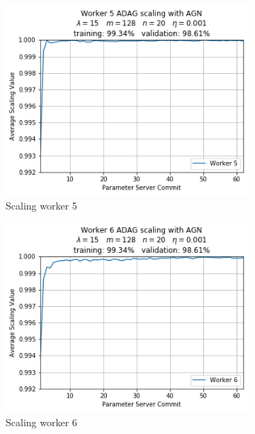 \begin{figure}
\begin{subfigure}{.24\textwidth}
    \includegraphics[width=\linewidth]{resources/images/plots/adag_agn_mnist/epoch_40/15/001/scaling/worker_5}
    \caption{Scaling worker 5}
  \end{subfigure}
  \begin{subfigure}{.24\textwidth}
    \centering
    \includegraphics[width=\linewidth]{resources/images/plots/adag_agn_mnist/epoch_40/15/001/scaling/worker_6}
    \caption{Scaling worker 6}
  \end{subfigure}
  \begin{subfigure}{.24\textwidth}
    \centering

\end{subfigure}
\end{figure}
